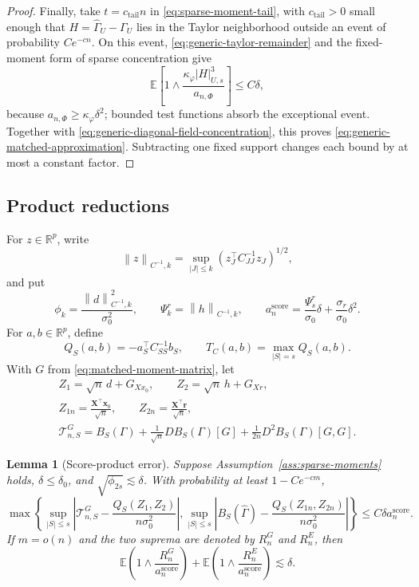 \documentclass[a4paper,11pt,english]{article}
\newtheorem{lemma}[theorem]{Lemma}
\newcommand{\E}{\mathbb E}
\newcommand{\norm}[1]{\left\lVert #1\right\rVert}
\newcommand{\R}{\mathbb R}
\begin{document}
\begin{proof}
Finally, take $t=c_{\mathrm{tail}}n$ in
\eqref{eq:sparse-moment-tail}, with $c_{\mathrm{tail}}>0$ small enough
that $H=\hat\Gamma_U-\Gamma_U$ lies in the Taylor neighborhood outside an
event of probability $Ce^{-cn}$.  On this event,
\eqref{eq:generic-taylor-remainder} and the fixed-moment form of sparse
concentration give
\[
 \E\left[1\wedge
 \frac{\kappa_\varphi|H|_{U,s}^3}{a_{n,\Phi}}\right]
 \le C\delta,
\]
because $a_{n,\Phi}\ge\kappa_\varphi\delta^2$; bounded test functions
absorb the exceptional event.  Together with
\eqref{eq:generic-diagonal-field-concentration}, this proves
\eqref{eq:generic-matched-approximation}.  Subtracting one fixed support
changes each bound by at most a constant factor.
\end{proof}

\subsection{Product reductions}

For $z\in\R^p$, write
\[
 \norm{z}_{C^{-1},k}
 =\sup_{|J|\le k}(z_J^\top C_{JJ}^{-1}z_J)^{1/2},
\]
and put
\begin{equation}\label{eq:technical-score-scales}
 \phi_k=\frac{\norm d_{C^{-1},k}^2}{\sigma_0^2},
 \qquad
 \Psi_k^r=\norm h_{C^{-1},k},
 \qquad
 a_n^{\mathrm{score}}
 =\frac{\Psi_s^r}{\sigma_0}\delta
 +\frac{\sigma_r}{\sigma_0}\delta^2.
\end{equation}
For $a,b\in\R^p$, define
\[
 Q_S(a,b)=-a_S^\top C_{SS}^{-1}b_S,
 \qquad T_C(a,b)=\max_{|S|=s}Q_S(a,b).
\]
With $G$ from \eqref{eq:matched-moment-matrix}, let
\begin{equation}\label{eq:technical-score-fields}
\begin{gathered}
 Z_1=\sqrt n\,d+G_{Xx_0},
 \qquad Z_2=\sqrt n\,h+G_{Xr},\\
 Z_{1n}=\frac{\mathbf X^\top\mathbf x_0}{\sqrt n},
 \qquad Z_{2n}=\frac{\mathbf X^\top\mathbf r}{\sqrt n},\\
 \mathcal T_{n,S}^G
 =B_S(\Gamma)+\frac1{\sqrt n}DB_S(\Gamma)[G]
 +\frac1{2n}D^2B_S(\Gamma)[G,G].
\end{gathered}
\end{equation}

\begin{lemma}[Score-product error]
\label{lem:technical-score-product}
Suppose Assumption~\ref{ass:sparse-moments} holds,
$\delta\le\delta_0$, and $\sqrt{\phi_{2s}}\lesssim\delta$.  With
probability at least $1-Ce^{-cm}$,
\begin{equation}\label{eq:technical-score-product-bound}
\max\left\{
 \sup_{|S|\le s}\left|
 \mathcal T_{n,S}^G-\frac{Q_S(Z_1,Z_2)}{n\sigma_0^2}\right|,
 \sup_{|S|\le s}\left|
 B_S(\hat\Gamma)-\frac{Q_S(Z_{1n},Z_{2n})}{n\sigma_0^2}\right|
\right\}
\le C\delta a_n^{\mathrm{score}}.
\end{equation}
If $m=o(n)$ and the two suprema are denoted by $R_n^G$ and $R_n^E$,
then
\begin{equation}\label{eq:technical-score-product-moments}
 \E\left(1\wedge\frac{R_n^G}{a_n^{\mathrm{score}}}\right)
 +\E\left(1\wedge\frac{R_n^E}{a_n^{\mathrm{score}}}\right)
 \lesssim\delta.
\end{equation}
\end{lemma}
\end{document}
